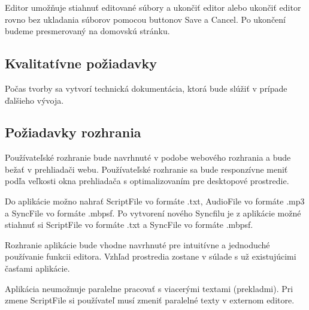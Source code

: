 \documentclass{article}
\begin{document}
\subsubsection{}
Editor umožňuje stiahnuť editované súbory a ukončiť editor alebo ukončiť editor rovno bez ukladania súborov pomocou buttonov Save a Cancel. Po ukončení budeme presmerovaný na domovskú stránku. 

\subsection{Kvalitatívne požiadavky}
Počas tvorby sa vytvorí technická dokumentácia, ktorá bude slúžiť v prípade ďalšieho vývoja.

\subsection{Požiadavky rozhrania}
Používateľské rozhranie bude navrhnuté v podobe webového rozhrania a bude bežať v prehliadači webu. Používateľské rozhranie sa bude responzívne meniť podľa veľkosti okna prehliadača s optimalizovaním pre desktopové prostredie.

Do aplikácie možno nahrať ScriptFile vo formáte .txt, AudioFile vo formáte .mp3 a SyncFile vo formáte .mbpsf. Po vytvorení nového Syncfilu je z aplikácie možné stiahnuť si ScriptFile vo formáte .txt a SyncFile vo formáte .mbpsf.

Rozhranie aplikácie bude vhodne navrhnuté pre intuitívne a jednoduché používanie funkcii editora. Vzhľad prostredia zostane v súlade s už existujúcimi časťami aplikácie.

Aplikácia neumožnuje paralelne pracovať s viacerými textami (prekladmi). Pri zmene ScriptFile si používateľ musí zmeniť paralelné texty v externom editore.
\end{document}
